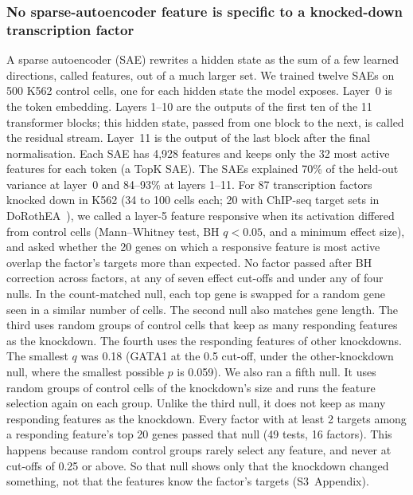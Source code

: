 \subsubsection*{No sparse-autoencoder feature is specific to a knocked-down transcription factor}
A sparse autoencoder (SAE) rewrites a hidden state as the sum of a few
learned directions, called features, out of a much larger set. We
trained twelve SAEs on 500 K562 control cells, one for each hidden state
the model exposes. Layer~0 is the token embedding. Layers 1--10 are the
outputs of the first ten of the 11 transformer blocks; this hidden state,
passed from one block to the next, is called the residual stream.
Layer~11 is the output of the last block after the final normalisation.
Each SAE has 4,928 features and keeps only the 32 most active features
for each token (a TopK SAE). The SAEs explained 70\% of the held-out
variance at layer~0 and 84--93\% at layers 1--11. For 87 transcription
factors knocked down in K562 (34 to 100 cells each; 20 with ChIP-seq
target sets in DoRothEA~\cite{garcia-alonso2019dorothea}), we called a
layer-5 feature responsive when its activation differed from control
cells (Mann--Whitney test, BH $q < 0.05$, and a minimum effect size),
and asked whether the 20 genes on which a responsive feature is most
active overlap the factor's targets more than expected. No factor passed
after BH correction across factors, at any of seven effect cut-offs and
under any of four nulls. In the count-matched null, each top gene is
swapped for a random gene seen in a similar number of cells. The second
null also matches gene length. The third uses random groups of control
cells that keep as many responding features as the knockdown. The fourth
uses the responding features of other knockdowns. The smallest $q$ was
0.18 (GATA1 at the 0.5 cut-off, under the other-knockdown null, where
the smallest possible $p$ is 0.059). We also ran a fifth null. It uses
random groups of control cells of the knockdown's size and runs the
feature selection again on each group. Unlike the third null, it does
not keep as many responding features as the knockdown. Every factor
with at least 2 targets among a responding feature's top 20 genes passed
that null (49 tests, 16 factors). This happens because random control
groups rarely select any feature, and never at cut-offs of 0.25 or
above. So that null shows only that the knockdown changed something, not
that the features know the factor's targets (S3~Appendix).

